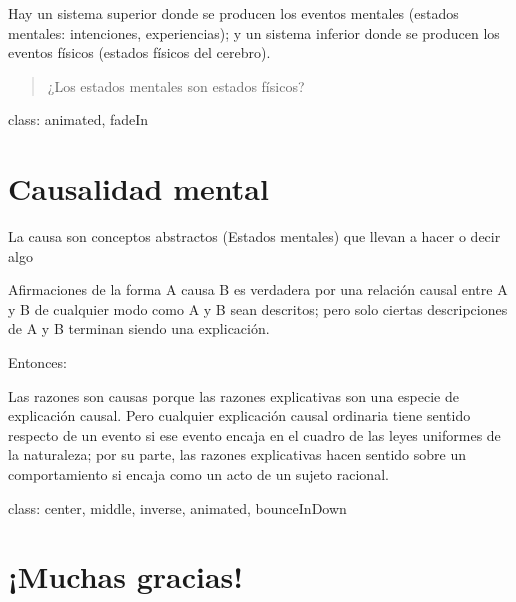 \documentclass[
]{article}
\begin{document}
Hay un sistema superior donde se producen los eventos mentales (estados
mentales: intenciones, experiencias); y un sistema inferior donde se
producen los eventos físicos (estados físicos del cerebro).

\begin{quote}
¿Los estados mentales son estados físicos?
\end{quote}

class: animated, fadeIn

\section{Causalidad mental}

La causa son conceptos abstractos (Estados mentales) que llevan a hacer
o decir algo

Afirmaciones de la forma A causa B es verdadera por una relación causal
entre A y B de cualquier modo como A y B sean descritos; pero solo
ciertas descripciones de A y B terminan siendo una explicación.

Entonces:

Las razones son causas porque las razones explicativas son una especie
de explicación causal. Pero cualquier explicación causal ordinaria tiene
sentido respecto de un evento si ese evento encaja en el cuadro de las
leyes uniformes de la naturaleza; por su parte, las razones explicativas
hacen sentido sobre un comportamiento si encaja como un acto de un
sujeto racional.

class: center, middle, inverse, animated, bounceInDown

\section{¡Muchas gracias!}
\end{document}
